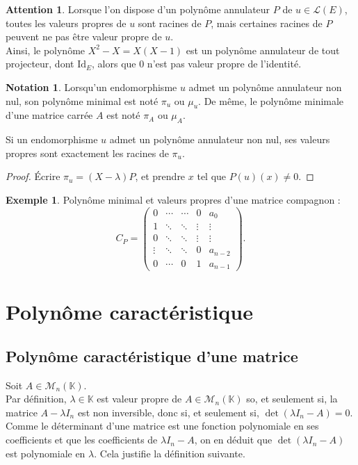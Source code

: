 \documentclass[french]{article}
\newcommand{\K}{\mathbb{K}}
\newcommand{\Id}{\text{Id}}
\theoremstyle{plain}
\theoremstyle{definition}
\newtheorem*{ex}{Exemple}
\newtheorem*{notation}{Notation}
\newtheorem*{attention}{Attention}
\theoremstyle{remark}
\begin{document}
	\begin{attention}
		Lorsque l'on dispose d'un polynôme annulateur $P$ de $u\in\mathcal{L}(E)$, toutes les valeurs propres de $u$ sont racines de $P$, mais certaines racines de $P$ peuvent ne pas être valeur propre de $u$.\\
		Ainsi, le polynôme $X^2-X=X(X-1)$ est un polynôme annulateur de tout projecteur, dont $\Id_E$, alors que $0$ n'est pas valeur propre de l'identité.
	\end{attention}
	
	\begin{notation}
		Lorsqu'un endomorphisme $u$ admet un polynôme annulateur non nul, son polynôme minimal est noté $\pi_u$ ou $\mu_u$. De même, le polynôme minimale d'une matrice carrée $A$ est noté $\pi_A$ ou $\mu_A$.
	\end{notation}
	
	\begin{prop}%
		Si un endomorphisme $u$ admet un polynôme annulateur non nul, ses valeurs propres sont exactement les racines de $\pi_u$.
	\end{prop}
	\begin{proof}
		Écrire $\pi_u=(X-\lambda)P$, et prendre $x$ tel que $P(u)(x)\ne 0$.
	\end{proof}
	
	\begin{ex}
		Polynôme minimal et valeurs propres d'une matrice compagnon : $$C_P=\begin{pmatrix}
			0&\cdots&\cdots&0&a_0\\
			1&\ddots&\ddots&\vdots&\vdots\\
			0&\ddots&\ddots&\vdots&\vdots\\
			\vdots&\ddots&\ddots&0&a_{n-2}\\
			0&\cdots&0&1&a_{n-1}
		\end{pmatrix}.$$
	\end{ex}
	
	\section{Polynôme caractéristique}
	
	\subsection{Polynôme caractéristique d'une matrice}
	
	Soit $A\in\mathcal{M}_n(\K)$.\\
	Par définition, $\lambda\in\K$ est valeur propre de $A\in\mathcal{M}_n(\K)$ so, et seulement si, la matrice $A-\lambda I_n$ est non inversible, donc si, et seulement si, $\det(\lambda I_n-A)=0$.\\
	Comme le déterminant d'une matrice est une fonction polynomiale en ses coefficients et que les coefficients de $\lambda I_n-A$, on en déduit que $\det(\lambda I_n-A)$ est polynomiale en $\lambda$. Cela justifie la définition suivante.
	
\end{document}

